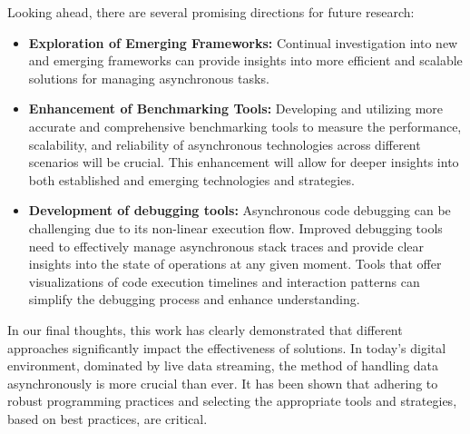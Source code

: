 Looking ahead, there are several promising directions for future research:

\begin{itemize}
    \item \textbf{Exploration of Emerging Frameworks:} Continual investigation into new and emerging frameworks can provide insights into more efficient and scalable solutions for managing asynchronous tasks.
    \item \textbf{Enhancement of Benchmarking Tools:} Developing and utilizing more accurate and comprehensive benchmarking tools to measure the performance, scalability, and reliability of asynchronous technologies across different scenarios will be crucial. This enhancement will allow for deeper insights into both established and emerging technologies and strategies.
    \item \textbf{Development of debugging tools:} Asynchronous code debugging can be challenging due to its non-linear execution flow. Improved debugging tools need to effectively manage asynchronous stack traces and provide clear insights into the state of operations at any given moment. Tools that offer visualizations of code execution timelines and interaction patterns can simplify the debugging process and enhance understanding.
\end{itemize}

In our final thoughts, this work has clearly demonstrated that different approaches significantly impact the effectiveness of solutions. In today's digital environment, dominated by live data streaming, the method of handling data asynchronously is more crucial than ever. It has been shown that adhering to robust programming practices and selecting the appropriate tools and strategies, based on best practices, are critical.


